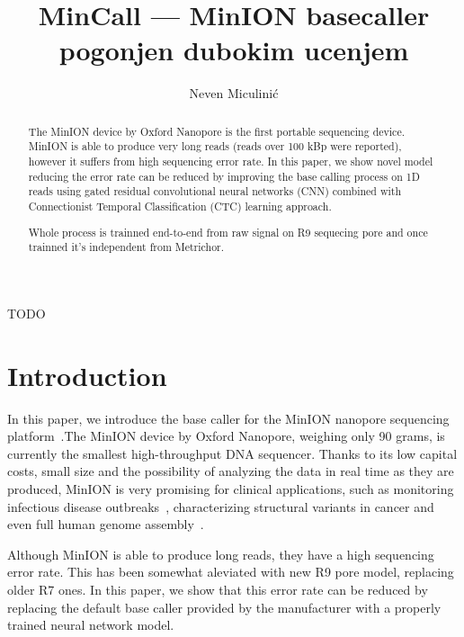 \documentclass[times, utf8, seminar, numeric]{fer}
\begin{document}
\theoremstyle{definition}
\newtheorem{definition}{Definition}[section]

\title{MinCall --- MinION  basecaller pogonjen dubokim ucenjem}
\author{Neven Miculinić}

\maketitle
\tableofcontents

\begin{sazetak}
TODO


\end{sazetak}

\begin{abstract}
    The MinION device by Oxford Nanopore is the first portable sequencing device. MinION is able to produce very long reads (reads over 100 kBp were reported), however it suffers from high sequencing error rate. In this paper, we show novel model reducing the error rate can be reduced by improving the base calling process on 1D reads using gated residual convolutional neural networks (CNN) combined with Connectionist Temporal Classification (CTC) learning approach.

    Whole process is trainned end-to-end from raw signal on R9 sequecing pore and once trainned it's independent from Metrichor.
\keywords{}
\end{abstract}

\chapter{Introduction}

In this paper, we introduce the base caller for the MinION nanopore sequencing platform~\cite{mikheyev2014first}.The MinION device by Oxford Nanopore, weighing only 90 grams, is currently the smallest high-throughput DNA sequencer. Thanks to its low capital costs, small size and the possibility of analyzing the data in real time as they are produced, MinION is very promising for clinical applications, such as monitoring infectious disease outbreaks~\cite{judge2015early}\cite{quick2016real}, characterizing structural variants in cancer\cite{norris2016nanopore} and even full human genome assembly~\cite{jain2017nanopore}.

Although MinION is able to produce long reads, they have a high sequencing error rate. This has been somewhat aleviated with new R9 pore model, replacing older R7 ones. In this paper, we show that this error rate can be reduced by replacing the default base caller provided by the manufacturer with a properly trained neural network model.
\end{document}
